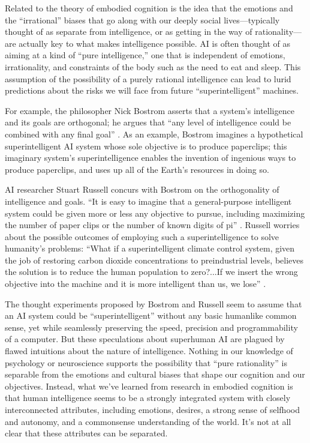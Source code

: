 \documentclass{article}
\begin{document}
Related to the theory of embodied cognition is the idea that the emotions and the ``irrational'' biases that go along with our deeply social lives---typically thought of as separate from intelligence, or as getting in the way of rationality---are actually key to what makes intelligence possible.  AI is often thought of as aiming at a kind of ``pure intelligence,'' one that is independent of emotions, irrationality, and constraints of the body such as the need to eat and sleep.  This assumption of the possibility of a purely rational intelligence can lead to lurid predictions about the risks we will face from future ``superintelligent'' machines.  

For example, the philosopher Nick Bostrom asserts that a system's intelligence and its goals are orthogonal; he argues that ``any level of intelligence could be combined with any final goal'' \cite{Bostrom2014}. As an example, Bostrom imagines a hypothetical superintelligent AI system whose sole objective is to produce paperclips; this imaginary system's superintelligence enables the invention of ingenious ways to produce paperclips, and uses up all of the Earth's resources in doing so.   

AI researcher Stuart Russell concurs with Bostrom on the orthogonality of intelligence and goals. ``It is easy to imagine that a general-purpose intelligent system could be given more or less any objective 
to pursue, including maximizing the number of paper clips or the number of known digits of pi''
\cite{Russell2019b}. Russell worries about the possible outcomes of employing such a superintelligence to solve humanity's problems:  ``What if a superintelligent climate control system, given the job of restoring carbon dioxide concentrations to preindustrial levels, believes the solution is to reduce the human population to zero?...If we insert the wrong objective into the machine and it is more intelligent than us, we lose'' \cite{Russell2019c}.

The thought experiments proposed by Bostrom and Russell seem to assume that an AI system could be ``superintelligent'' without any basic humanlike common sense, yet while seamlessly preserving the speed, precision and programmability of a computer.  But these speculations about superhuman AI are plagued by flawed intuitions about the nature of intelligence.  Nothing in our knowledge of psychology or neuroscience supports the possibility that ``pure rationality'' is separable from the emotions and cultural biases that shape our cognition and our objectives.  Instead, what we've learned from research in embodied cognition is that human intelligence seems to be a strongly integrated system with closely interconnected attributes, including emotions, desires, a strong sense of selfhood and autonomy, and a commonsense understanding of the world.  It's not at all clear that these attributes can be separated.
\end{document}
